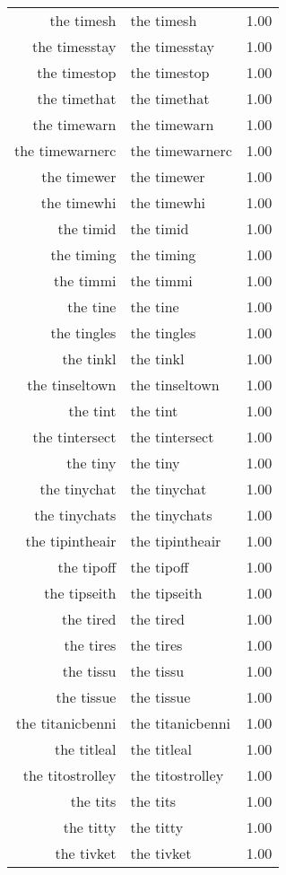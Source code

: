\begin{table}[ht]
\begin{tabular}{rlr}
  the timesh & the timesh & 1.00 \\ 
  the timesstay & the timesstay & 1.00 \\ 
  the timestop & the timestop & 1.00 \\ 
  the timethat & the timethat & 1.00 \\ 
  the timewarn & the timewarn & 1.00 \\ 
  the timewarnerc & the timewarnerc & 1.00 \\ 
  the timewer & the timewer & 1.00 \\ 
  the timewhi & the timewhi & 1.00 \\ 
  the timid & the timid & 1.00 \\ 
  the timing & the timing & 1.00 \\ 
  the timmi & the timmi & 1.00 \\ 
  the tine & the tine & 1.00 \\ 
  the tingles & the tingles & 1.00 \\ 
  the tinkl & the tinkl & 1.00 \\ 
  the tinseltown & the tinseltown & 1.00 \\ 
  the tint & the tint & 1.00 \\ 
  the tintersect & the tintersect & 1.00 \\ 
  the tiny & the tiny & 1.00 \\ 
  the tinychat & the tinychat & 1.00 \\ 
  the tinychats & the tinychats & 1.00 \\ 
  the tipintheair & the tipintheair & 1.00 \\ 
  the tipoff & the tipoff & 1.00 \\ 
  the tipseith & the tipseith & 1.00 \\ 
  the tired & the tired & 1.00 \\ 
  the tires & the tires & 1.00 \\ 
  the tissu & the tissu & 1.00 \\ 
  the tissue & the tissue & 1.00 \\ 
  the titanicbenni & the titanicbenni & 1.00 \\ 
  the titleal & the titleal & 1.00 \\ 
  the titostrolley & the titostrolley & 1.00 \\ 
  the tits & the tits & 1.00 \\ 
  the titty & the titty & 1.00 \\ 
  the tivket & the tivket & 1.00 \\ 

\end{tabular}
\end{table}
